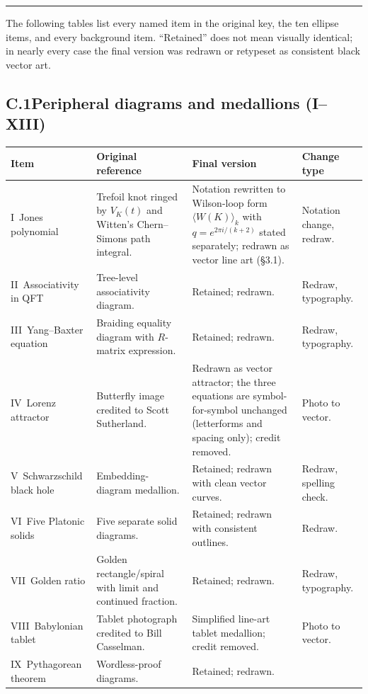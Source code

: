 \documentclass[10pt]{article}
\newcommand{\head}[1]{\par\vspace{7pt}{\noindent\large\bfseries #1}\par
  \vspace{1pt}\noindent\rule{\linewidth}{0.4pt}\par\vspace{2pt}}
\begin{document}
\newpage
\head{Appendix C\quad Element-by-element changes}
The following tables list every named item in the original key, the ten
ellipse items, and every background item. ``Retained'' does not mean
visually identical; in nearly every case the final version was redrawn
or retypeset as consistent black vector art.

\subsection*{C.1\quad Peripheral diagrams and medallions (I--XIII)}
\renewcommand{\arraystretch}{1.22}
\begin{longtable}{@{}L{2.55cm} L{4.6cm} L{5.5cm} L{2.9cm}@{}}
\toprule
\textbf{Item} & \textbf{Original reference} & \textbf{Final version} & \textbf{Change type}\\
\midrule
\endhead
I~Jones polynomial & Trefoil knot ringed by $V_K(t)$ and Witten's
  Chern--Simons path integral. & Notation rewritten to Wilson-loop form
  $\langle W(K)\rangle_k$ with $q = e^{2\pi i/(k+2)}$ stated separately;
  redrawn as vector line art (\S3.1). & Notation change, redraw.\\
II~Associativity in QFT & Tree-level associativity diagram. & Retained;
  redrawn. & Redraw, typography.\\
III~Yang--Baxter equation & Braiding equality diagram with $R$-matrix
  expression. & Retained; redrawn. & Redraw, typography.\\
IV~Lorenz attractor & Butterfly image credited to Scott Sutherland. &
  Redrawn as vector attractor; the three equations are symbol-for-symbol
  unchanged (letterforms and spacing only); credit removed. & Photo to
  vector.\\
V~Schwarzschild black hole & Embedding-diagram medallion. & Retained;
  redrawn with clean vector curves. & Redraw, spelling check.\\
VI~Five Platonic solids & Five separate solid diagrams. & Retained;
  redrawn with consistent outlines. & Redraw.\\
VII~Golden ratio & Golden rectangle/spiral with limit and continued
  fraction. & Retained; redrawn. & Redraw, typography.\\
VIII~Babylonian tablet & Tablet photograph credited to Bill Casselman.
  & Simplified line-art tablet medallion; credit removed. & Photo to
  vector.\\
IX~Pythagorean theorem & Wordless-proof diagrams. & Retained; redrawn.

\end{longtable}
\end{document}
